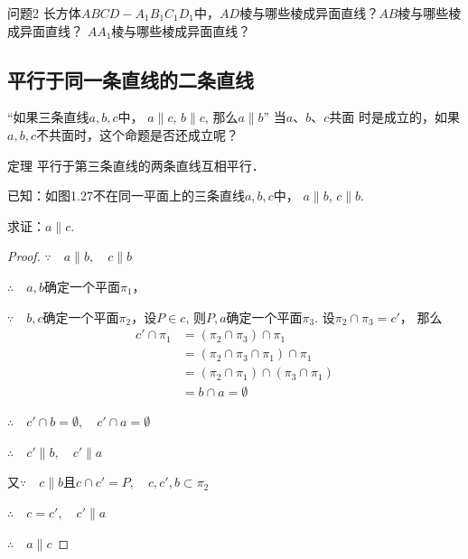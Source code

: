 \begin{blk}{问题2}
  长方体$ABCD-A_1B_1C_1D_1$中，$AD$棱与哪些棱成异面直线？$AB$棱与哪些棱成异面直线？
$AA_1$棱与哪些棱成异面直线？
\end{blk}

\subsection{平行于同一条直线的二条直线}
“如果三条直线$a,b,c$中，
$a\parallel c$, $b\parallel c$, 那么$a\parallel b$” 当$a$、$b$、$c$共面
时是成立的，如果$a,b,c$不共面时，这个命题是否还成立呢？

\begin{blk}
  {定理} 平行于第三条直线的两条直线互相平行．
\end{blk}

已知：如图1.27不在同一平面上的三条直线$a,b,c$中，
$a\parallel b$, $c\parallel b$. 

求证：$a\parallel c$.

\begin{figure}[htp]
  \centering
{}
  \caption{}
\end{figure}


\begin{proof}
  $\because\quad a\parallel b,\quad c\parallel b$

  $\therefore\quad a,b$确定一个平面$\pi_1$，

  $\because\quad b,c$确定一个平面$\pi_2$，设$P\in c$, 则$P,a$确定一个平面$\pi_3$. 设$\pi_2\cap \pi_3=c'$，
  那么
\[\begin{split}
  c'\cap \pi_1&=(\pi_2\cap \pi_3)\cap \pi_1\\
  &=(\pi_2\cap \pi_3\cap \pi_1)\cap \pi_1\\
  &=(\pi_2\cap \pi_1)\cap (\pi_3\cap \pi_1)\\
  &=b\cap a=\emptyset
\end{split}\]

$\therefore\quad c'\cap b=\emptyset,\quad c'\cap a=\emptyset$

$\therefore\quad c'\parallel b,\quad c'\parallel a$

又$\because\quad c\parallel b$且$c\cap c'=P,\quad c,c',b\subset \pi_2$

$\therefore\quad c=c',\quad c'\parallel a$

$\therefore\quad a\parallel c$
\end{proof}

